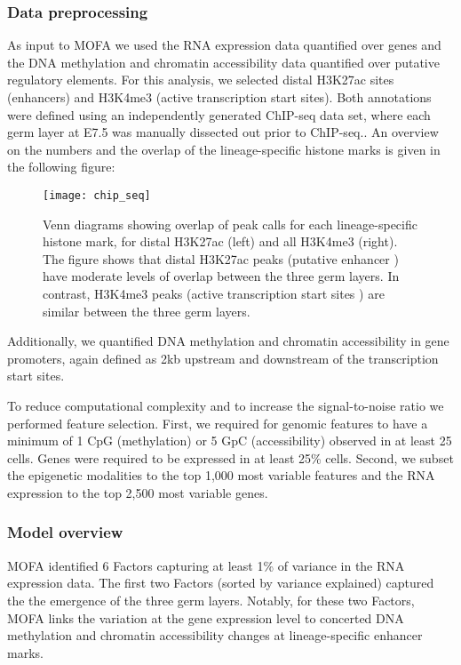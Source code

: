 \subsubsection{Data preprocessing}

As input to MOFA we used the RNA expression data quantified over genes and the DNA methylation and chromatin accessibility data quantified over putative regulatory elements. For this analysis, we selected distal H3K27ac sites (enhancers) and H3K4me3 (active transcription start sites). Both annotations were defined using an independently generated ChIP-seq data set, where each germ layer at E7.5 was manually dissected out prior to ChIP-seq.\cite{Xiang2020}. An overview on the numbers and the overlap of the lineage-specific histone marks is given in the following figure:

\begin{figure}[H]
	\texttt{[image: chip\_seq]}
	\caption{
	Venn diagrams showing overlap of peak calls for each lineage-specific histone mark, for distal H3K27ac (left) and all H3K4me3 (right). The figure shows that distal H3K27ac peaks (putative enhancer \cite{Creyghton2010}) have moderate levels of overlap between the three germ layers. In contrast, H3K4me3 peaks (active transcription start sites \cite{Liang2004}) are similar between the three germ layers.
	}
	\label{fig:chip_seq}
\end{figure}

Additionally, we quantified DNA methylation and chromatin accessibility in gene promoters, again defined as 2kb upstream and downstream of the transcription start sites.

To reduce computational complexity and to increase the signal-to-noise ratio we performed feature selection. First, we required for genomic features to have a minimum of 1 CpG (methylation) or 5 GpC (accessibility) observed in at least 25 cells. Genes were required to be expressed in at least 25\% cells. Second, we subset the epigenetic modalities to the top 1,000 most variable features and the RNA expression to the top 2,500 most variable genes.

\subsubsection{Model overview}

MOFA identified 6 Factors capturing at least 1\% of variance in the RNA expression data. The first two Factors (sorted by variance explained) captured the the emergence of the three germ layers. Notably, for these two Factors, MOFA links the variation at the gene expression level to concerted DNA methylation and chromatin accessibility changes at lineage-specific enhancer marks. 

